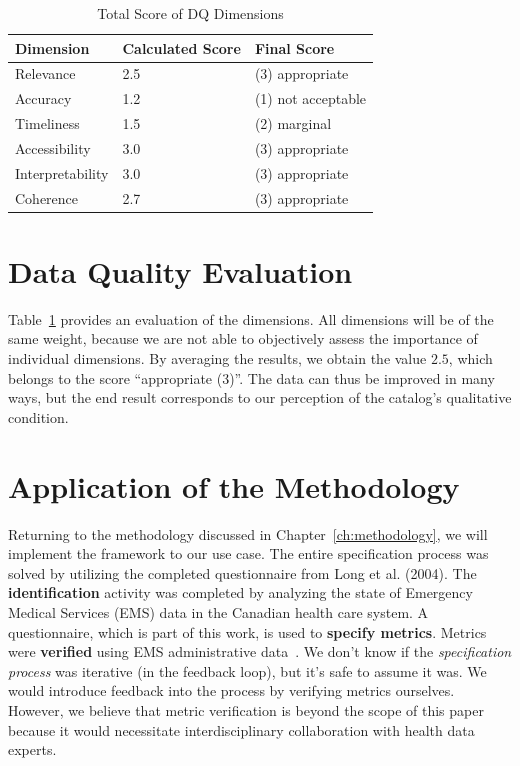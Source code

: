 \begin{table}[htbp]
    \centering

    \begin{tabular}{lll}
        \toprule
        Dimension           & Calculated Score  & Final Score           \\ \midrule
        Relevance           & 2.5               & (3) appropriate       \\
        Accuracy            & 1.2               & (1) not acceptable    \\
        Timeliness          & 1.5               & (2) marginal          \\
        Accessibility       & 3.0               & (3) appropriate       \\
        Interpretability    & 3.0               & (3) appropriate       \\
        Coherence           & 2.7               & (3) appropriate       \\
            
        \bottomrule
    \end{tabular}

    \caption{Total Score of DQ Dimensions}
    \label{table:dimensions-score}
\end{table}
\FloatBarrier

\section{Data Quality Evaluation}

Table~\ref{table:dimensions-score} provides an evaluation of the dimensions.
All dimensions will be of the same weight, because we are not able to objectively assess the importance of individual dimensions.
By averaging the results, we obtain the value \( 2.5 \), which belongs to the score \enquote{appropriate (3)}.
The data can thus be improved in many ways, but the end result corresponds to our perception of the catalog's qualitative condition.

\section{Application of the Methodology}

Returning to the methodology discussed in Chapter~\ref{ch:methodology}, we will implement the framework to our use case.
The entire specification process was solved by utilizing the completed questionnaire from Long et al. (2004).
The \textbf{identification} activity was completed by analyzing the state of Emergency Medical Services (EMS) data in the Canadian health care system.
A questionnaire, which is part of this work, is used to \textbf{specify metrics}.
Metrics were \textbf{verified} using EMS administrative data~\cite{long2004}.
We don't know if the \textit{specification process} was iterative (in the feedback loop), but it's safe to assume it was.
We would introduce feedback into the process by verifying metrics ourselves.
However, we believe that metric verification is beyond the scope of this paper because it would necessitate interdisciplinary collaboration with health data experts.

